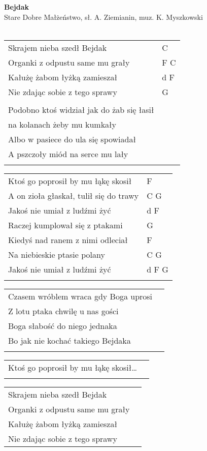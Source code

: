 \documentclass[a5paper]{article}
\begin{document}


\noindent
\fontsize{12pt}{15pt}\selectfont
\textbf{Bejdak} \\
\fontsize{8pt}{10pt}\selectfont
Stare Dobre Małżeństwo,  sł. A. Ziemianin, muz. K. Myszkowski \\ \\
\fontsize{10pt}{12pt}\selectfont
{}
\begin{tabular}{@{}p{8.5cm}p{3cm}@{}}
\noindent
Skrajem nieba szedł Bejdak & C \\
Organki z odpustu same mu grały & F C \\
Kałużę żabom łyżką zamieszał & d F \\
Nie zdając sobie z tego sprawy & G \\ \\

Podobno ktoś widział jak do żab się łasił \\
na kolanach żeby mu kumkały \\
Albo w pasiece do ula się spowiadał \\
A pszczoły miód na serce mu lały \\ \\
\end{tabular}

\noindent
\begin{tabular}{@{}p{7.5cm}p{3cm}@{}}
Ktoś go poprosił by mu łąkę skosił & F \\
A on zioła głaskał, tulił się do trawy & C G \\
Jakoś nie umiał z ludźmi żyć & d F \\
Raczej kumplował się z ptakami & G \\
Kiedyś nad ranem z nimi odleciał & F \\
Na niebieskie ptasie polany & C G \\
Jakoś nie umiał z ludźmi żyć & d F G \\ \\
\end{tabular}

\noindent
\begin{tabular}{@{}p{8.5cm}p{3cm}@{}}
Czasem wróblem wraca gdy Boga uprosi\\
Z lotu ptaka chwilę u nas gości\\
Boga słabość do niego jednaka\\
Bo jak nie kochać takiego Bejdaka\\\\
\end{tabular}

\noindent
\begin{tabular}{@{}p{8.5cm}p{3cm}@{}}
Ktoś go poprosił by mu łąkę skosił…\\\\
\end{tabular}

\noindent
\begin{tabular}{@{}p{8.5cm}p{3cm}@{}}
Skrajem nieba szedł Bejdak \\
Organki z odpustu same mu grały\\ 
Kałużę żabom łyżką zamieszał \\
Nie zdając sobie z tego sprawy
\end{tabular}
\end{document}
